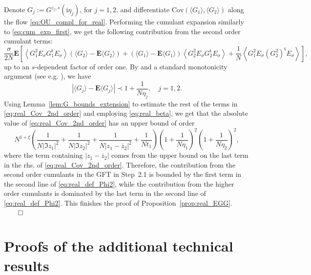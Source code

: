\documentclass[10pt]{amsart}
\numberwithin{equation}{section}
\newcommand{\E}{\mathbf{E}}
\newcommand{\ii}{\mathrm{i}}
\newcommand{\mt}{\mathfrak{t}}
\begin{document}
Denote $G_j:=G^{z_j,s}(\ii\eta_j)$, for $j=1,2$, and differentiate $\mathrm{Cov}(\langle G_1\rangle,\langle G_2\rangle)$ along the flow \eqref{eq:OU_compl_for_real}. Performing the cumulant expansion similarly to \eqref{eq:cum_exp_first}, we get the following contribution from the second order cumulant terms:
\begin{equation}
\frac{\sigma}{2N}\E\left[ \left\langle G_1^2E_\sigma G_1^\mt E_\sigma\right\rangle\left(\langle G_2\rangle -\E\langle G_2\rangle\right)+\left(\langle G_1\rangle -\E\langle G_1\rangle\right)\left\langle G_2^2E_\sigma G_2^\mt E_\sigma \right\rangle + \frac{1}{N}\left\langle G_1^2 E_\sigma (G_2^2)^\mt E_\sigma\right\rangle\right],
\label{eq:real_Cov_2nd_order}
\end{equation}
up to an $s$-dependent factor of order one. By \cite[Lemma~B.7]{cipolloni2024maximum} and a standard monotonicity argument (see e.g. \cite[Lemma~5.3]{cusp_univ}), we have 
\begin{equation*}
\left\vert\langle G_j\rangle -\E\langle G_j\rangle\right\vert\prec 1+\frac{1}{N\eta_j},\quad j=1,2.
\end{equation*}
Using Lemma~\ref{lem:G_bounds_extension} to estimate the rest of the terms in \eqref{eq:real_Cov_2nd_order} and employing \eqref{eq:real_beta}, we get that the absolute value of \eqref{eq:real_Cov_2nd_order} has an upper bound of order
\begin{equation*}
N^{1+\xi}\left(\frac{1}{N|\Im z_1|^2}+\frac{1}{N|\Im z_2|^2}+ \frac{1}{N|z_1-\overline{z}_2|^2} +\frac{1}{Nt_1}\right)\left(1+\frac{1}{N\eta_1}\right)^2\left(1+\frac{1}{N\eta_2}\right)^2,
\end{equation*}
where the term containing $|z_1-\overline{z}_2|$ comes from the upper bound on the last term in the rhs. of \eqref{eq:real_Cov_2nd_order}. Therefore, the contribution from the second order cumulants in the GFT in Step~2.1 is bounded by the first term in the second line of \eqref{eq:real_def_Phi2}, while the contribution from the higher order cumulants is dominated by the last term in the second line of \eqref{eq:real_def_Phi2}. This finishes the proof of Proposition~\ref{prop:real_EGG}.\hfill$\qed$

\section{Proofs of the additional technical results}
\end{document}
